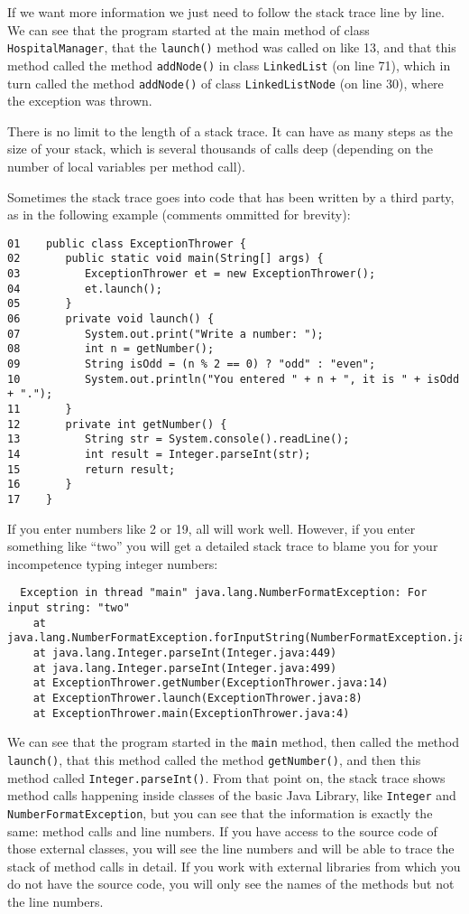 If we want more information we just need to follow the stack trace
line by line. We can see that the program started at the main method
of class \verb+HospitalManager+, that the \verb+launch()+ method was
called on like 13, and that this method called the method
\verb+addNode()+ in class \verb+LinkedList+ (on line 71), which in
turn called the method \verb+addNode()+ of class \verb+LinkedListNode+
(on line 30), where the exception was thrown. 

There is no limit to the length of a stack trace. It can have as
many steps as the size of your stack, which is several thousands of
calls deep (depending on the number of local variables per method
call). 

Sometimes the stack trace goes into code that has been written by a
third party, 
as in the following example (comments ommitted for brevity): 

\begin{verbatim}
01    public class ExceptionThrower {
02       public static void main(String[] args) {
03          ExceptionThrower et = new ExceptionThrower();
04          et.launch();
05       }
06       private void launch() {
07          System.out.print("Write a number: ");
08          int n = getNumber();
09          String isOdd = (n % 2 == 0) ? "odd" : "even";
10          System.out.println("You entered " + n + ", it is " + isOdd + ".");
11       }
12       private int getNumber() {
13          String str = System.console().readLine();
14          int result = Integer.parseInt(str);
15          return result;
16       }
17    }
\end{verbatim}

If you enter numbers like 2 or 19, all will work well. However, if you
enter something like ``two'' you will get a detailed stack trace to
blame you for your incompetence typing integer numbers: 

\begin{verbatim}
  Exception in thread "main" java.lang.NumberFormatException: For input string: "two"
    at java.lang.NumberFormatException.forInputString(NumberFormatException.java:48)
    at java.lang.Integer.parseInt(Integer.java:449)
    at java.lang.Integer.parseInt(Integer.java:499)
    at ExceptionThrower.getNumber(ExceptionThrower.java:14)
    at ExceptionThrower.launch(ExceptionThrower.java:8)
    at ExceptionThrower.main(ExceptionThrower.java:4)
\end{verbatim}

We can see that the program started in the \verb+main+ method, then called
the method \verb+launch()+, that this method called the method
\verb+getNumber()+, and then this method called
\verb+Integer.parseInt()+. From that point on, the stack trace shows
method calls happening inside classes of the basic Java Library, like
\verb+Integer+ and \verb+NumberFormatException+, but you can see that
the information is exactly the same: method calls and line numbers. If
you have access to the source code of those external classes, you will
see the line numbers and will be able to trace the stack of method
calls in detail. If you work with external libraries from which you do
not have the source code, you will only see the names of the methods
but not the line numbers. 

